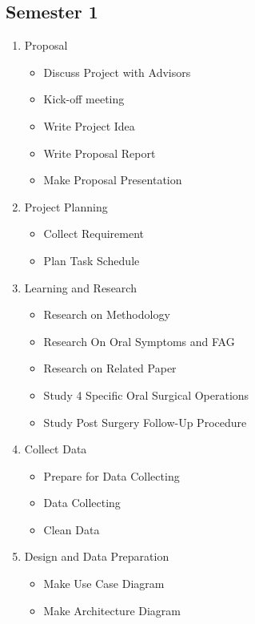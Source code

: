 \documentclass[12pt,oneside,openright,a4paper]{cpe-english-project}
\begin{document}
    \subsection{Semester 1}
      \begin{enumerate}
        \item Proposal
          \begin{itemize}
            \item Discuss Project with Advisors
            \item Kick-off meeting
            \item Write Project Idea
            \item Write Proposal Report
            \item Make Proposal Presentation          
          \end{itemize}
        \item Project Planning
          \begin{itemize}
            \item Collect Requirement
            \item Plan Task Schedule          
          \end{itemize}
        \item Learning and Research
          \begin{itemize}
            \item Research on Methodology
            \item Research On Oral Symptoms and FAG
            \item Research on Related Paper
            \item Study 4 Specific Oral Surgical Operations
            \item Study Post Surgery Follow-Up Procedure
          \end{itemize}
        \item Collect Data
          \begin{itemize}
            \item Prepare for Data Collecting
            \item Data Collecting
            \item Clean Data                 
          \end{itemize}
        \item Design and Data Preparation
          \begin{itemize}
            \item Make Use Case Diagram
            \item Make Architecture Diagram

\end{itemize}
\end{enumerate}
\end{document}
